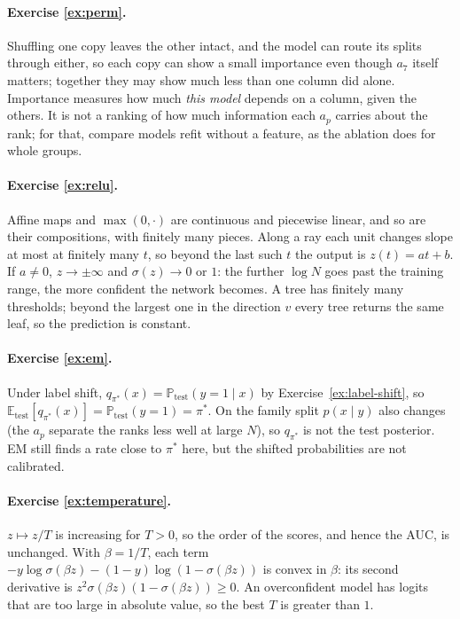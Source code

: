 \documentclass[11pt]{article}
\theoremstyle{definition}
\theoremstyle{plain}
\theoremstyle{remark}
\newcommand{\E}{\mathbb{E}}
\renewcommand{\P}{\mathbb{P}}
\renewcommand{\_}{\oldunderscore\allowbreak}
\begin{document}
\paragraph{Exercise \ref{ex:perm}.}
Shuffling one copy leaves the other intact, and the model can route its splits through either,
so each copy can show a small importance even though $a_7$ itself matters; together they may
show much less than one column did alone. Importance measures how much \emph{this model}
depends on a column, given the others. It is not a ranking of how much information each $a_p$
carries about the rank; for that, compare models refit without a feature, as the ablation does
for whole groups.

\paragraph{Exercise \ref{ex:relu}.}
Affine maps and $\max(0,\cdot)$ are continuous and piecewise linear, and so are their
compositions, with finitely many pieces. Along a ray each unit changes slope at most at
finitely many $t$, so beyond the last such $t$ the output is $z(t)=at+b$. If $a\neq0$, $z\to\pm\infty$
and $\sigma(z)\to0$ or $1$: the further $\log N$ goes past the training range, the more confident
the network becomes. A tree has finitely many thresholds; beyond the largest one in the
direction $v$ every tree returns the same leaf, so the prediction is constant.

\paragraph{Exercise \ref{ex:em}.}
Under label shift, $q_{\pi^*}(x)=\P_{\text{test}}(y=1\mid x)$ by Exercise~\ref{ex:label-shift}, so
$\E_{\text{test}}[q_{\pi^*}(x)]=\P_{\text{test}}(y=1)=\pi^*$. On the family split $p(x\mid y)$ also
changes (the $a_p$ separate the ranks less well at large $N$), so $q_{\pi^*}$ is not the test
posterior. EM still finds a rate close to $\pi^*$ here, but the shifted probabilities are not
calibrated.

\paragraph{Exercise \ref{ex:temperature}.}
$z\mapsto z/T$ is increasing for $T>0$, so the order of the scores, and hence the AUC, is
unchanged. With $\beta=1/T$, each term $-y\log\sigma(\beta z)-(1-y)\log(1-\sigma(\beta z))$ is
convex in $\beta$: its second derivative is $z^2\sigma(\beta z)(1-\sigma(\beta z))\ge0$. An
overconfident model has logits that are too large in absolute value, so the best $T$ is
greater than $1$.
\end{document}
